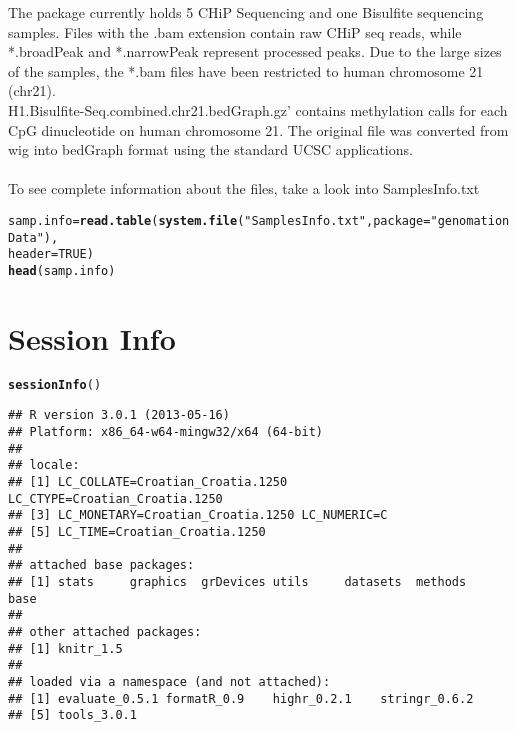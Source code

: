 \documentclass[12pt]{article}\usepackage[]{graphicx}\usepackage[]{color}
\makeatletter
\newcommand{\hlnum}[1]{\textcolor[rgb]{0.686,0.059,0.569}{#1}}%
\newcommand{\hlstr}[1]{\textcolor[rgb]{0.192,0.494,0.8}{#1}}%
\newcommand{\hlstd}[1]{\textcolor[rgb]{0.345,0.345,0.345}{#1}}%
\newcommand{\hlkwb}[1]{\textcolor[rgb]{0.69,0.353,0.396}{#1}}%
\newcommand{\hlkwc}[1]{\textcolor[rgb]{0.333,0.667,0.333}{#1}}%
\newcommand{\hlkwd}[1]{\textcolor[rgb]{0.737,0.353,0.396}{\textbf{#1}}}%
\newenvironment{kframe}{%
 \def\at@end@of@kframe{}%
 \ifinner\ifhmode%
  \def\at@end@of@kframe{\end{minipage}}%
  \begin{minipage}{\columnwidth}%
 \fi\fi%
 \def\FrameCommand##1{\hskip\@totalleftmargin \hskip-\fboxsep
 \colorbox{shadecolor}{##1}\hskip-\fboxsep
     \hskip-\linewidth \hskip-\@totalleftmargin \hskip\columnwidth}%
 \MakeFramed {\advance\hsize-\width
   \@totalleftmargin\z@ \linewidth\hsize
   \@setminipage}}%
 {\par\unskip\endMakeFramed%
 \at@end@of@kframe}
\newenvironment{knitrout}{}{} %
\makeatother
\begin{document}
The package currently holds 5 CHiP Sequencing and one Bisulfite sequencing samples. 
Files with the .bam extension contain raw CHiP seq reads, while *.broadPeak and *.narrowPeak represent processed peaks. 
Due to the large sizes of the samples, the *.bam files have been restricted to human chromosome 21 (chr21).
\\
H1.Bisulfite-Seq.combined.chr21.bedGraph.gz' contains methylation calls for each CpG dinucleotide on human chromosome 21. 
The original file was converted from wig into bedGraph format using the standard UCSC applications.
\\
\\
To see complete information about the files, take a look into SamplesInfo.txt
\begin{knitrout}
\color{fgcolor}\begin{kframe}
\begin{alltt}
\hlstd{samp.info} \hlkwb{=} \hlkwd{read.table}\hlstd{(}\hlkwd{system.file}\hlstd{(}\hlstr{"SamplesInfo.txt"}\hlstd{,} \hlkwc{package} \hlstd{=} \hlstr{"genomationData"}\hlstd{),}
    \hlkwc{header} \hlstd{=} \hlnum{TRUE}\hlstd{)}
\hlkwd{head}\hlstd{(samp.info)}
\end{alltt}
\end{kframe}
\end{knitrout}


\section{Session Info}
\begin{knitrout}
\color{fgcolor}\begin{kframe}
\begin{alltt}
\hlkwd{sessionInfo}\hlstd{()}
\end{alltt}
\begin{verbatim}
## R version 3.0.1 (2013-05-16)
## Platform: x86_64-w64-mingw32/x64 (64-bit)
## 
## locale:
## [1] LC_COLLATE=Croatian_Croatia.1250  LC_CTYPE=Croatian_Croatia.1250   
## [3] LC_MONETARY=Croatian_Croatia.1250 LC_NUMERIC=C                     
## [5] LC_TIME=Croatian_Croatia.1250    
## 
## attached base packages:
## [1] stats     graphics  grDevices utils     datasets  methods   base     
## 
## other attached packages:
## [1] knitr_1.5
## 
## loaded via a namespace (and not attached):
## [1] evaluate_0.5.1 formatR_0.9    highr_0.2.1    stringr_0.6.2 
## [5] tools_3.0.1
\end{verbatim}
\end{kframe}
\end{knitrout}




\end{document}
